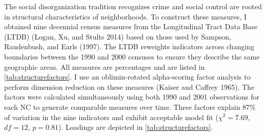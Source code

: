 \documentclass [11pt, proquest] {uwthesis}[2015/03/03]
\begin{document}
The social disorganization tradition recognizes crime and social control are rooted in structural characteristics of neighborhoods. To construct these measures, I obtained nine decennial census measures from the Longitudinal Tract Data Base (LTDB) (Logan, Xu, and Stults 2014) based on those used by Sampson, Raudenbush, and Earls (1997). The LTDB reweights indicators across changing boundaries between the 1990 and 2000 censuses to ensure they describe the same geographic areas. All measures are percentages and are listed in \ref{tab:structurefactors}. I use an oblimin-rotated alpha-scoring factor analysis to perform dimension reduction on these measures (Kaiser and Caffrey 1965). The factors were calculated simultaneously using both 1990 and 2001 observations for each NC to generate comparable measures over time. Three factors explain 87\% of variation in the nine indicators and exhibit acceptable model fit (\(\chi^{2}=7.69\), \(df = 12\), \(p=0.81\)). Loadings are depicted in \ref{tab:structurefactors}.

\providecommand{\docline}[3]{\noalign{\global\setlength{\arrayrulewidth}{#1}}\arrayrulecolor[HTML]{#2}\cline{#3}}

\setlength{\tabcolsep}{4pt}
\end{document}
